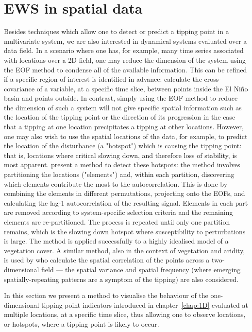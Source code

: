 \section{EWS in spatial data}
\label{sec:2D:ExtensionToGridded}

Besides techniques which allow one to detect or predict a tipping point in a multivariate system, we are also interested in dynamical systems evaluated over a data field. In a scenario where one has, for example, many time series associated with locations over a 2D field, one may reduce the dimension of the system using the EOF method to condense all of the available information. This can be refined if a specific region of interest is identified in advance: \citet{ludescher2013,ludescher2014} calculate the cross-covariance of a variable, at a specific time slice, between points inside the El Ni\~{n}o basin and points outside. In contrast, simply using the EOF method to reduce the dimension of such a system will not give specific spatial information such as the location of the tipping point or the direction of its progression in the case that a tipping at one location precipitates a tipping at other locations. However, one may also wish to use the spatial locations of the data, for example, to predict the location of the disturbance (a "hotspot") which is causing the tipping point: that is, locations where critical slowing down, and therefore loss of stability, is most apparent. \citet{bathiany2013p1} present a method to detect these hotspots: the method involves partitioning the locations ("elements") and, within each partition, discovering which elements contribute the most to the autocorrelation. This is done by combining the elements in different permutations, projecting onto the EOFs, and calculating the lag-1 autocorrelation of the resulting signal. Elements in each part are removed according to system-specific selection criteria and the remaining elements are re-partitioned. The process is repeated until only one partition remains, which is the slowing down hotspot where susceptibility to perturbations is large. The method is applied successfully to a highly idealised model of a vegetation cover. A similar method, also in the context of vegetation and aridity, is used by \citet{kefi2014early} who calculate the spatial correlation of the points across a two-dimensional field — the spatial variance and spatial frequency (where emerging spatially-repeating patterns are a symptom of the tipping) are also considered.

In this section we present a method to visualise the behaviour of the one-dimensional tipping point indicators introduced in chapter~\ref{chap:1D} evaluated at multiple locations, at a specific time slice, thus allowing one to observe locations, or hotspots, where a tipping point is likely to occur. 

